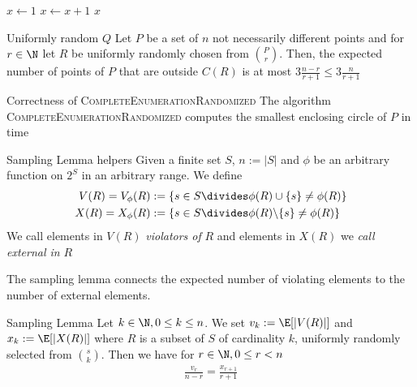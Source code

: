\begin{algorithm}
    \caption{Choose uniformly random number}\label{alg:t-uniformly-random-numbers}
    \begin{algorithmic}[1]
            \State {}
            \State $x \gets 1$
                \State $x \gets x + 1$
            \EndWhile
            \State \Return $x$
        \EndProcedure
    \end{algorithmic}
\end{algorithm}

\begin{lemma}[]{Uniformly random $Q$}
    Let $P$ be a set of $n$ not necessarily different points and for $r \in \N$ let $R$ be uniformly randomly chosen from ${P \choose r}$. Then, the expected number of points of $P$ that are outside $C(R)$ is at most $3 \frac{n - r}{r + 1} \leq 3\frac{n}{r + 1}$
\end{lemma}

\begin{theorem}[]{Correctness of \textsc{CompleteEnumerationRandomized}}
    The algorithm \textsc{CompleteEnumerationRandomized} computes the smallest enclosing circle of $P$ in time 
\end{theorem}


\begin{definition}[]{Sampling Lemma helpers}
    Given a finite set $S$, $n := |S|$ and $\phi$ be an arbitrary function on $2^S$ in an arbitrary range. We define
    \begin{align*}
        V(R) = V_{\phi}(R) & := \{ s \in S \divides \phi(R) \cup \{s\} \neq \phi(R) \}       \\
        X(R) = X_{\phi}(R) & := \{ s \in S \divides \phi(R) \backslash \{s\} \neq \phi(R) \}
    \end{align*}
    We call elements in $V(R)$ \textit{violators of} $R$ and elements in $X(R)$ we \textit{call external in} $R$
\end{definition}

The sampling lemma connects the expected number of violating elements to the number of external elements.
\begin{lemma}[]{Sampling Lemma}
    Let $k \in \N, 0 \leq k \leq n$. We set $v_k := \E[|V(R)|]$ and $x_k := \E[|X(R)|]$ where $R$ is a subset of $S$ of cardinality $k$, uniformly randomly selected from ${s \choose k}$. Then we have for $r \in \N, 0 \leq r <n$
    \begin{align*}
        \frac{v_r}{n - r} = \frac{x_{r + 1}}{r + 1}
    \end{align*}
\end{lemma}


